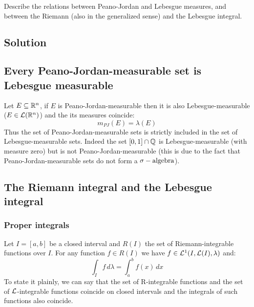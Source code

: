 
\question
Describe the relations between Peano-Jordan and Lebesgue measures, and between the Riemann (also in the generalized sense) and the Lebesgue integral.

\subsection*{Solution}

\subsection{Every Peano-Jordan-measurable set is Lebesgue measurable}
Let $E\subseteq\mathbb{R}^n$, if $E$ is Peano-Jordan-measurable then it is also Lebesgue-measurable ($E\in\mathcal{L}(\mathbb{R}^n)$) and the its measures coincide:
\[
    m_{PJ} (E) = \lambda(E)    
\]
Thus the set of Peano-Jordan-measurable sets is strictly included in the set of Lebesgue-measurable sets. Indeed the set $[0,1]\cap\mathbb{Q}$ is Lebesgue-measurable (with measure zero) but is not Peano-Jordan-measurable (this is due to the fact that Peano-Jordan-measurable sets do not form a $\sigma-\text{algebra}$).

\subsection{The Riemann integral and the Lebesgue integral}

\subsubsection*{Proper integrals}
Let $I=[a,b]$ be a closed interval and $R(I)$ the set of Riemann-integrable functions over $I$. For any function $f\in R(I)$ we have $f\in\mathcal{L}^1(I,\mathcal{L}(I),\lambda)$ and:
\[
    \int_I f \, d\lambda = \int_a^b f(x) \, dx    
\]
To state it plainly, we can say that the set of R-integrable functions and the set of $\mathcal{L}$-integrable functions coincide on closed intervals and the integrals of such functions also coincide.

